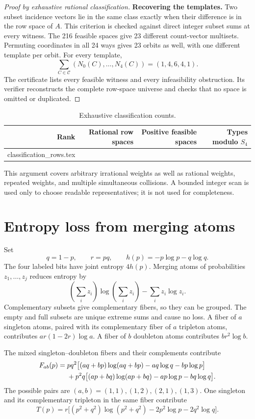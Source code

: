 \documentclass[11pt,a4paper]{article}
\makeatletter
\newcommand{\calC}{\mathcal{C}}
\let\inputtable\@@input
\makeatother
\begin{document}
\begin{proof}[Proof by exhaustive rational classification]
\textbf{Recovering the templates.}
Two subset incidence vectors lie in the same class exactly when their
difference is in the row space of \(A\). This criterion is checked
against direct integer subset sums at every witness.
The 216 feasible spaces give 23 different count-vector multisets.
Permuting coordinates in all 24 ways gives 23 orbits as well, with
one different template per orbit. For every template,
\[
 \sum_{C\in\calC}(N_0(C),\ldots,N_4(C))=(1,4,6,4,1).
\]
The certificate lists every feasible witness and every infeasibility
obstruction. Its verifier reconstructs the complete row-space universe
and checks that no space is omitted or duplicated.
\end{proof}

\begin{table}[ht]
\centering
\caption{Exhaustive classification counts.}\label{tab:ranks}
\begin{tabular}{rrrr}
\toprule
Rank & Rational row spaces & Positive feasible spaces & Types modulo \(S_4\)\\
\midrule
\inputtable classification_rows.tex
\bottomrule
\end{tabular}
\end{table}

This argument covers arbitrary irrational weights as well as rational
weights, repeated weights, and multiple simultaneous collisions.
A bounded integer scan is used only to choose readable representatives;
it is not used for completeness.

\section{Entropy loss from merging atoms}
Set
\[
 q=1-p,\qquad r=pq,\qquad h(p)=-p\log p-q\log q.
\]
The four labeled bits have joint entropy \(4h(p)\).
Merging atoms of probabilities \(z_1,\ldots,z_j\) reduces entropy by
\[
 \left(\sum_i z_i\right)\log\left(\sum_i z_i\right)
 -\sum_i z_i\log z_i.
\]
Complementary subsets give complementary fibers, so they can be grouped.
The empty and full subsets are unique extreme sums and cause no loss.
A fiber of \(a\) singleton atoms, paired with its complementary fiber
of \(a\) tripleton atoms, contributes
\(ar(1-2r)\log a\).
A fiber of \(b\) doubleton atoms contributes \(br^2\log b\).

The mixed singleton--doubleton fibers and their complements contribute
\begin{align}
 F_{ab}(p)={}&pq^2\bigl[(aq+bp)\log(aq+bp)
                    -aq\log q-bp\log p\bigr]\notag\\
 &+p^2q\bigl[(ap+bq)\log(ap+bq)
                    -ap\log p-bq\log q\bigr].\label{eq:F}
\end{align}
The possible pairs are \((a,b)=(1,1),(1,2),(2,1),(1,3)\).
One singleton and its complementary tripleton in the same fiber
contribute
\[
 T(p)=r\bigl[(p^2+q^2)\log(p^2+q^2)-2p^2\log p-2q^2\log q\bigr].
\]
\end{document}
